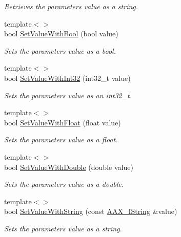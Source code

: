 \begin{DoxyCompactItemize}
\begin{DoxyCompactList}\small\item\em Retrieves the parameter\textquotesingle{}s value as a string. \end{DoxyCompactList}\item 
{\footnotesize template$<$$>$ }\\bool \hyperlink{a00033_aa741c6432107eab6bf8796833a6f2cde}{Set\+Value\+With\+Bool} (bool value)
\begin{DoxyCompactList}\small\item\em Sets the parameter\textquotesingle{}s value as a bool. \end{DoxyCompactList}\item 
{\footnotesize template$<$$>$ }\\bool \hyperlink{a00033_a0071856d5eafd8053126642b63a41f4f}{Set\+Value\+With\+Int32} (int32\+\_\+t value)
\begin{DoxyCompactList}\small\item\em Sets the parameter\textquotesingle{}s value as an int32\+\_\+t. \end{DoxyCompactList}\item 
{\footnotesize template$<$$>$ }\\bool \hyperlink{a00033_aa06c3f670310e2022c89385b354fc2c8}{Set\+Value\+With\+Float} (float value)
\begin{DoxyCompactList}\small\item\em Sets the parameter\textquotesingle{}s value as a float. \end{DoxyCompactList}\item 
{\footnotesize template$<$$>$ }\\bool \hyperlink{a00033_af33746072bc8c5dd950fce15f81d1e4c}{Set\+Value\+With\+Double} (double value)
\begin{DoxyCompactList}\small\item\em Sets the parameter\textquotesingle{}s value as a double. \end{DoxyCompactList}\item 
{\footnotesize template$<$$>$ }\\bool \hyperlink{a00033_a73d6d6e280fb970dcc7d65682ace4f73}{Set\+Value\+With\+String} (const \hyperlink{a00113}{A\+A\+X\+\_\+\+I\+String} \&value)
\begin{DoxyCompactList}\small\item\em Sets the parameter\textquotesingle{}s value as a string. \end{DoxyCompactList}\item 

\end{DoxyCompactItemize}
